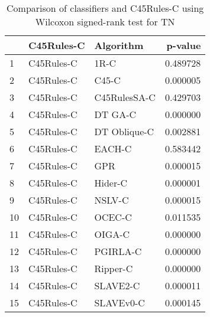 \begin{table}
\footnotesize
\caption{Comparison of classifiers and C45Rules-C using Wilcoxon signed-rank test for TN}
\label{tab:C45Rules-C wilcoxon TN comparison}
\begin{tabular}{lllr}
\hline
 & C45Rules-C & Algorithm & p-value \\
\hline
1 & C45Rules-C & 1R-C & 0.489728 \\
2 & C45Rules-C & C45-C & 0.000005 \\
3 & C45Rules-C & C45RulesSA-C & 0.429703 \\
4 & C45Rules-C & DT GA-C & 0.000000 \\
5 & C45Rules-C & DT Oblique-C & 0.002881 \\
6 & C45Rules-C & EACH-C & 0.583442 \\
7 & C45Rules-C & GPR & 0.000015 \\
8 & C45Rules-C & Hider-C & 0.000001 \\
9 & C45Rules-C & NSLV-C & 0.000015 \\
10 & C45Rules-C & OCEC-C & 0.011535 \\
11 & C45Rules-C & OIGA-C & 0.000000 \\
12 & C45Rules-C & PGIRLA-C & 0.000000 \\
13 & C45Rules-C & Ripper-C & 0.000000 \\
14 & C45Rules-C & SLAVE2-C & 0.000011 \\
15 & C45Rules-C & SLAVEv0-C & 0.000145 \\
\hline
\end{tabular}
\end{table}
